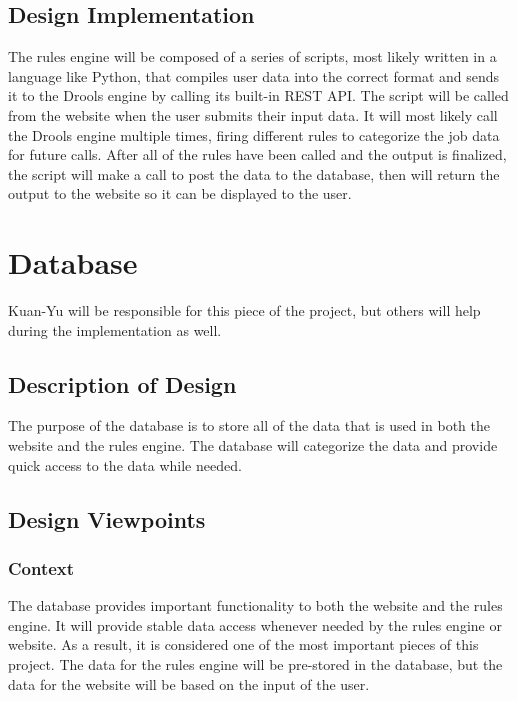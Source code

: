 \documentclass[draftclsnofoot,onecolumn,10pt,compsoc]{IEEEtran}
\begin{document}
\subsection{Design Implementation}
The rules engine will be composed of a series of scripts, most likely written in a language like Python, that compiles user data into the correct format and sends it to the Drools engine by calling its built-in REST API. The script will be called from the website when the user submits their input data. It will most likely call the Drools engine multiple times, firing different rules to categorize the job data for future calls. After all of the rules have been called and the output is finalized, the script will make a call to post the data to the database, then will return the output to the website so it can be displayed to the user.


\pagebreak %
\section{Database}
Kuan-Yu will be responsible for this piece of the project, but others will help during the implementation as well. 

\subsection{Description of Design}
The purpose of the database is to store all of the data that is used in both the website and the rules engine. The database will categorize the data and provide quick access to the data while needed. 

\subsection{Design Viewpoints}
\subsubsection{Context}
The database provides important functionality to both the website and the rules engine. It will provide stable data access whenever needed by the rules engine or website. As a result, it is considered one of the most important pieces of this project. The data for the rules engine will be pre-stored in the database, but the data for the website will be based on the input of the user. 
\end{document}
